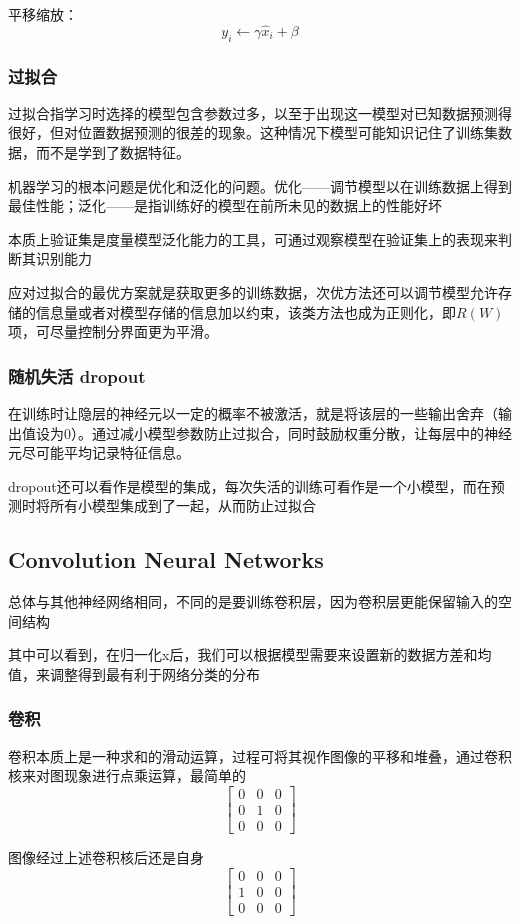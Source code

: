 \documentclass[12pt]{article}
\begin{document}
平移缩放：
$$y_i\leftarrow\gamma\widehat{x}_i+\beta$$

\subsubsection{过拟合}
过拟合指学习时选择的模型包含参数过多，以至于出现这一模型对已知数据预测得很好，但对位置数据预测的很差的现象。这种情况下模型可能知识记住了训练集数据，而不是学到了数据特征。

机器学习的根本问题是优化和泛化的问题。优化——调节模型以在训练数据上得到最佳性能；泛化——是指训练好的模型在前所未见的数据上的性能好坏

本质上验证集是度量模型泛化能力的工具，可通过观察模型在验证集上的表现来判断其识别能力

应对过拟合的最优方案就是获取更多的训练数据，次优方法还可以调节模型允许存储的信息量或者对模型存储的信息加以约束，该类方法也成为正则化，即$R(W)$项，可尽量控制分界面更为平滑。

\subsubsection{随机失活 dropout}
在训练时让隐层的神经元以一定的概率不被激活，就是将该层的一些输出舍弃（输出值设为0）。通过减小模型参数防止过拟合，同时鼓励权重分散，让每层中的神经元尽可能平均记录特征信息。

dropout还可以看作是模型的集成，每次失活的训练可看作是一个小模型，而在预测时将所有小模型集成到了一起，从而防止过拟合

\subsection{Convolution Neural Networks}
总体与其他神经网络相同，不同的是要训练卷积层，因为卷积层更能保留输入的空间结构

其中可以看到，在归一化x后，我们可以根据模型需要来设置新的数据方差和均值，来调整得到最有利于网络分类的分布

\subsubsection{卷积}
卷积本质上是一种求和的滑动运算，过程可将其视作图像的平移和堆叠，通过卷积核来对图现象进行点乘运算，最简单的
\[
\begin{bmatrix}
0 & 0 & 0\\
0 & 1 & 0\\
0 & 0 & 0
\end{bmatrix}
\]

图像经过上述卷积核后还是自身
\[
\begin{bmatrix}
0 & 0 & 0\\
1 & 0 & 0\\
0 & 0 & 0
\end{bmatrix}
\]
\end{document}
